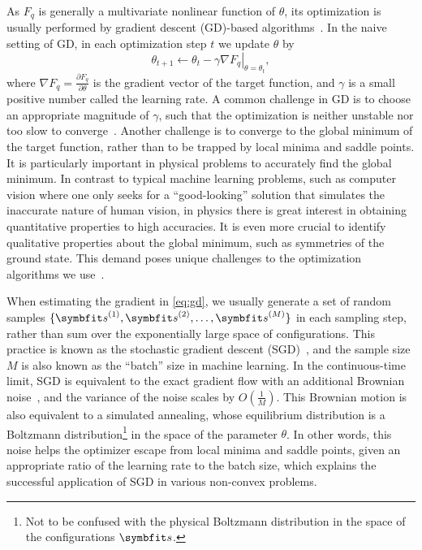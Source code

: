 As $F_q$ is generally a multivariate nonlinear function of $\theta$, its optimization is usually performed by gradient descent (GD)-based algorithms~\cite{curry1944method}. In the naive setting of GD, in each optimization step $t$ we update $\theta$ by
\begin{equation}
\theta_{t + 1} \gets \theta_t - \gamma \left. \nabla F_q \right|_{\theta = \theta_t},
\label{eq:gd}
\end{equation}
where $\nabla F_q = \frac{\partial F_q}{\partial \theta}$ is the gradient vector of the target function, and $\gamma$ is a small positive number called the learning rate. A common challenge in GD is to choose an appropriate magnitude of $\gamma$, such that the optimization is neither unstable nor too slow to converge~\cite{boyd2004convex}. Another challenge is to converge to the global minimum of the target function, rather than to be trapped by local minima and saddle points. It is particularly important in physical problems to accurately find the global minimum. In contrast to typical machine learning problems, such as computer vision where one only seeks for a ``good-looking'' solution that simulates the inaccurate nature of human vision, in physics there is great interest in obtaining quantitative properties to high accuracies. It is even more crucial to identify qualitative properties about the global minimum, such as symmetries of the ground state. This demand poses unique challenges to the optimization algorithms we use~\cite{chen2023efficient, michaud2023precision}.

When estimating the gradient in \cref{eq:gd}, we usually generate a set of random samples $\{\vs^{(1)}, \vs^{(2)}, \ldots, \vs^{(M)}\}$ in each sampling step, rather than sum over the exponentially large space of configurations. This practice is known as the stochastic gradient descent (SGD)~\cite{robbins1951stochastic, bottou1998online}, and the sample size $M$ is also known as the ``batch'' size in machine learning. In the continuous-time limit, SGD is equivalent to the exact gradient flow with an additional Brownian noise~\cite{hu2017diffusion}, and the variance of the noise scales by $O\left( \frac{1}{M} \right)$. This Brownian motion is also equivalent to a simulated annealing, whose equilibrium distribution is a Boltzmann distribution\footnote{Not to be confused with the physical Boltzmann distribution in the space of the configurations $\vs$.} in the space of the parameter $\theta$. In other words, this noise helps the optimizer escape from local minima and saddle points, given an appropriate ratio of the learning rate to the batch size, which explains the successful application of SGD in various non-convex problems.

